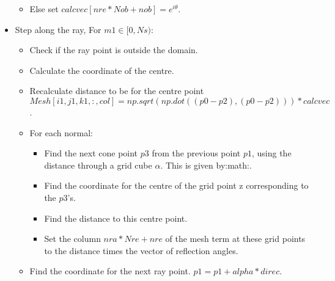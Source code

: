 \documentclass[letterpaper,10pt,english]{sphinxmanual}
\begin{document}
\begin{fulllineitems}
\begin{fulllineitems}
\begin{itemize}
\begin{itemize}
\item {} 
Else set \(calcvec[nre*Nob+nob]=e^{i \theta}\).

\end{itemize}

\item {} 
Step along the ray, For \(m1\in[0,Ns):\)
\begin{itemize}
\item {} 
Check if the ray point is outside the domain.

\item {} 
Calculate the co\sphinxhyphen{}ordinate of the centre.

\item {} 
Recalculate distance to be for the centre point       \(Mesh[i1,j1,k1,:,col]=np.sqrt(np.dot((p0-p2),(p0-p2)))*calcvec\).

\item {} 
For each normal:
\begin{itemize}
\item {} 
Find the next cone point \(p3\) from the previous point         \(p1\), using the distance through a grid cube         \(\alpha\). This is given by:math:.

\item {} 
Find the co\sphinxhyphen{}ordinate for the centre of the grid point z         corresponding to the \(p3\)’s.

\item {} 
Find the distance to this centre point.

\item {} 
Set the column \(nra*Nre+nre\) of the mesh term at         these grid points to the distance times the vector of         reflection angles.

\end{itemize}

\begin{sphinxVerbatim}[commandchars=\\\{\}]
\PYG{p}{[}\PYG{p}{[}\PYG{p}{]}\PYG{p}{[}\PYG{p}{]}\PYG{p}{[}\PYG{p}{]}\PYG{p}{[}\PYG{p}{]}\PYG{p}{[}\PYG{p}{]}\PYG{p}{[}\PYG{p}{]}\PYG{p}{]}\PYG{p}{[}\PYG{p}{]}
\end{sphinxVerbatim}

\item {} 
Find the co\sphinxhyphen{}ordinate for the next ray point.       \(p1=p1+alpha*direc\).


\end{itemize}
\end{itemize}
\end{fulllineitems}
\end{fulllineitems}
\end{document}
